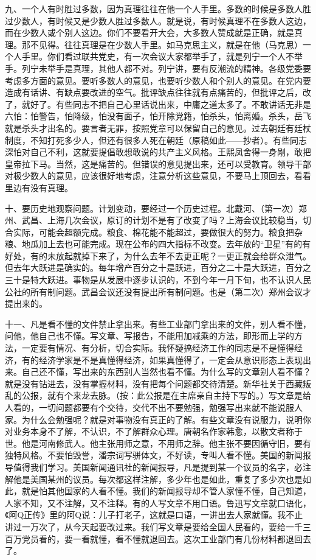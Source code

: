 九、一个人有时胜过多数，因为真理往往在他一个人手里。多数的时候是多数人胜过少数人，有时候又是少数人胜过多数人。就是说，有时候真理不在多数人这边，而在少数人或个别人这边。你们不要看开大会，大多数人赞成就是正确，就是真理。那不见得。往往真理是在少数人手里。如马克思主义，就是在他（马克思）一个人手里。你们看过联共党史，有一次会议大家都举手了，就是列宁一个人不举手。列宁未举手是真理，其他人都不对。列宁讲，要有反潮流的精神。各级党委要考虑多方面的意见。要听多数人的意见，也要听少数人和个别人的意见。在党内要造成有话讲、有缺点要改进的空气。批评缺点往往就有点痛苦的，但批评之后，改了，就好了。有些同志不把自己心里话说出来，中庸之道太多了。不敢讲话无非是六怕：怕警告，怕降级，怕没有面子，怕开除党籍，怕杀头，怕离婚。杀头，岳飞就是杀头才出名的。要言者无罪，按照党章可以保留自己的意见。过去朝廷有廷杖制度，不知打死多少人，但还有很多人死在朝廷（原稿如此——抄者）。有些同志深怕对自己不利，这就要提倡敢想敢说的共产主义风格。王熙凤舍得一身剐，敢把皇帝拉下马。当然，这是痛苦的。但错误的意见提出来，还可以受教育。领导干部对极少数人的意见，应该很好地考虑，注意分析这些意见，不要马上顶回去，看看里边有没有真理。

十、要历史地观察问题。计划变动，要经过一个历史过程。北戴河、（第一次）郑州、武昌、上海几次会议，原订的计划不是有了改变了吗？上海会议比较稳当，切合实际，可能会超额完成。粮食、棉花能不能超过，要做很大的努力。粮食把杂粮、地瓜加上去也可能完成。现在公布的四大指标不改变。去年放的“卫星”有的有好处，有的未放起就掉下来了，为什么去年不去更正呢？一更正就会给群众泄气。但去年大跃进是确实的。每年增产百分之十是跃进，百分之二十是大跃进，百分之三十是特大跃进。事物是从发展中逐步认识的，不到今年一月下旬，也不认识人民公社的所有制问题。武昌会议还没有提出所有制问题。也是（第二次）郑州会议才提出来的。

十一、凡是看不懂的文件禁止拿出来。有些工业部门拿出来的文件，别人看不懂，问他，他自己也不懂。写文章、写报告，不能用加减乘的方法，即形而上学的方法，一定要有情况、有分析，切合实际。我怀疑搞经济工作的同志是不是懂得经济，有的经济学家是不是真懂得经济，如果真懂得了，一定会从意识形态上表现出来。自己还不懂，写出来的东西别人当然也看不懂。为什么写的文章别人看不懂？就是没有钻进去，没有掌握材料，没有把每个问题都交待清楚。新华社关于西藏叛乱的公报，就有个来龙去脉。（按：此公报是在主席亲自主持下写的。）写文章是给人看的，一切问题都要有个交待，交代不出不要勉强，勉强写出来就不能说服人家。为什么会勉强呢？就是对事物没有真正的了解。有些文章没有说服力，说明你对业务本身不了解，不认识，不了解群众心理。唐朝名作家韩愈，以散文者称于世。他是河南修武人。他主张用师之意，不用师之辞。他主张不要因循守旧，要有独特风格。不要怕毁誉，潘宗词写骈体文，不好读，专叫人看不懂。美国的新闻报导值得我们学习。美国新闻通讯社的新闻报导，凡是提到某一个议员的名字，必注解他是美国某州的议员。每次都这样注解，多少年也是如此，重复了多少次也是如此，就是怕其他国家的人看不懂。我们的新闻报导却不管人家懂不懂，自己知道，人家不知，又不注解，又不注释。有的人写文章不用口语。鲁迅写文章就口语化，《阿Q正传》里的阿Q说：儿子打老子，这就是口语，一讲出去人家就懂。我不止讲过一万次了，从今天起要改过来。我们写文章是要给全国人民看的，要给一千三百万党员看的，要一看就懂，看不懂就退回去。这次工业部门有几份材料都退回去了。

